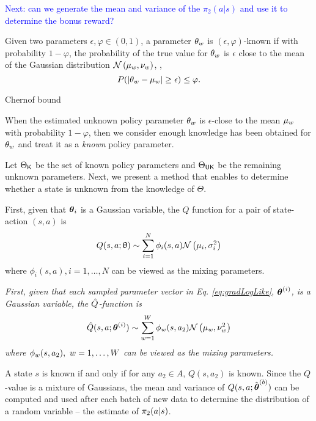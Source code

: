    \textcolor{blue}{Next: can we generate the mean and variance of the $\pi_2(a|s)$ and use it to determine the bonus reward?}

    \begin{definition}
        Given two parameters $\epsilon, \varphi \in (0,1)$, a parameter $\theta_{w}$ is $(\epsilon,
        \varphi)$-known if with probability $1-\varphi$, the probability of the true value for $\theta_{w}$ is
        $\epsilon$ close to the mean of the Gaussian distribution $\mathcal{N}\left(\mu_{w}, \nu_{w}\right)$, \ie,
        \[
        P(\lvert\theta_{w} - \mu_{w}\rvert \ge \epsilon) \le \varphi.
        \]
    \end{definition}

    Chernof bound 

        \brk
        \brk

    When the estimated unknown policy parameter $\theta_{w}$ is $\epsilon$-close to the mean $\mu_{w}$ with
    probability $1-\varphi$, then we consider enough knowledge has been obtained for $\theta_{w}$ and treat it as a
    \emph{known} policy parameter.

    Let $\Theta_{\mathsf{K}}$ be the set of known policy parameters and $\Theta_{\mathsf{UK}}$ be the remaining unknown
    parameters.  Next, we present a method that enables to determine whether a state is unknown from the knowledge of
    $\Theta$.

    First, given that $\boldsymbol{\mathbb{\theta}}_i$ is a Gaussian variable, the $Q$ function for a pair of state-action $(s,a)$ is
    \[
    Q(s,a ;\uptheta) \sim \sum_{i=1}^N \phi_i(s,a) \mathcal{N}\left(\mu_i, \sigma_i^2\right)
    \]
    where $\phi_i(s,a),i=1,\ldots, N$ can be viewed as the mixing parameters.

    \emph{First, given that each sampled parameter vector in Eq. \ref{eq:gradLogLike}, $\boldsymbol{\mathbb{\theta}}^{(i)}$, is a Gaussian
          variable, the $\hat{Q}$-function is
          \[
          \hat{Q}(s,a ;\boldsymbol{\mathbb{\theta}}^{(i)}) \sim \sum_{w=1}^W \phi_{w}(s,a_2) \mathcal{N}\left(\mu_w, \nu_w^2\right)
          \]
          where $\phi_{w}(s,a_2),\ w=1,\ldots, W$ can be viewed as the mixing parameters. }

    A state $s$ is known if and only if for any $a_2 \in A$, $Q(s,a_2)$ is known. Since the $Q$-value is a mixture of
    Gaussians, the mean and variance of $Q(s,a;\hat{\boldsymbol{\mathbb{\theta}}}^{(b)})$ can be computed and used after each batch of
    new data to determine the distribution of a random variable -- the estimate of $\pi_{2}(a|s)$.

